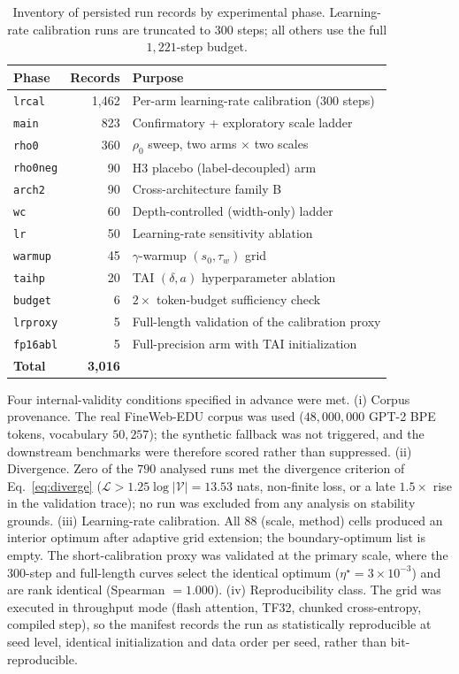 \documentclass[final,5p,times,twocolumn]{elsarticle}
\theoremstyle{remark}
\newcommand{\rhoz}{\rho_{0}}
\begin{document}
\begin{table}[t]
\centering
\small
\caption{Inventory of persisted run records by experimental phase. Learning-rate
calibration runs are truncated to 300 steps; all others use the full
$1{,}221$-step budget.}
\label{tab:inventory}
\begin{tabular}{@{}lrl@{}}
\toprule
Phase & Records & Purpose \\
\midrule
\texttt{lrcal} & 1{,}462 & Per-arm learning-rate calibration (300 steps) \\
\texttt{main} & \phantom{0}823 & Confirmatory + exploratory scale ladder \\
\texttt{rho0} & \phantom{0}360 & $\rhoz$ sweep, two arms $\times$ two scales \\
\texttt{rho0neg} & \phantom{00}90 & H3 placebo (label-decoupled) arm \\
\texttt{arch2} & \phantom{00}90 & Cross-architecture family B \\
\texttt{wc} & \phantom{00}60 & Depth-controlled (width-only) ladder \\
\texttt{lr} & \phantom{00}50 & Learning-rate sensitivity ablation \\
\texttt{warmup} & \phantom{00}45 & $\gamma$-warmup $(s_0,\tau_w)$ grid \\
\texttt{taihp} & \phantom{00}20 & TAI $(\delta,a)$ hyperparameter ablation \\
\texttt{budget} & \phantom{000}6 & $2\times$ token-budget sufficiency check \\
\texttt{lrproxy} & \phantom{000}5 & Full-length validation of the calibration proxy \\
\texttt{fp16abl} & \phantom{000}5 & Full-precision arm with TAI initialization \\
\midrule
\textbf{Total} & \textbf{3{,}016} & \\
\bottomrule
\end{tabular}
\end{table}

Four internal-validity conditions specified in advance were met.
(i) Corpus provenance. The real FineWeb-EDU corpus was used
($48{,}000{,}000$ GPT-2 BPE tokens, vocabulary $50{,}257$); the synthetic
fallback was not triggered, and the downstream benchmarks were therefore
scored rather than suppressed. (ii) Divergence. Zero of the $790$
analysed runs met the divergence criterion of Eq.~\eqref{eq:diverge}
($\mathcal{L} > 1.25\log|\mathcal{V}| = 13.53$ nats, non-finite loss, or a
late $1.5\times$ rise in the validation trace); no run was excluded from any
analysis on stability grounds. (iii) Learning-rate calibration. All
$88$ (scale, method) cells produced an interior optimum after adaptive grid
extension; the boundary-optimum list is empty. The short-calibration proxy was
validated at the primary scale, where the $300$-step and full-length curves
select the identical optimum ($\eta^\star = 3\times 10^{-3}$) and are rank
identical (Spearman $= 1.000$). (iv) Reproducibility class. The grid was
executed in throughput mode (flash attention, TF32, chunked cross-entropy,
compiled step), so the manifest records the run as statistically
reproducible at seed level, identical initialization and data order per
seed, rather than bit-reproducible.
\end{document}
